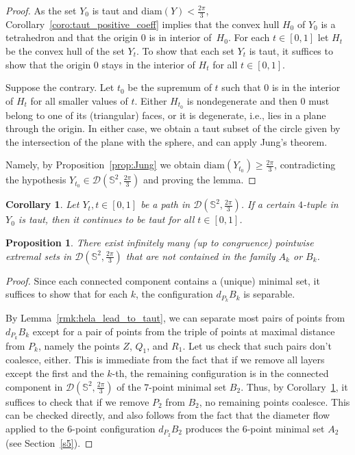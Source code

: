 \documentclass[12pt]{amsart}
\theoremstyle{plain}
\newtheorem{corollary}[theorem]{Corollary}
\newtheorem{proposition}[theorem]{Proposition}
\newcommand{\Sp}{\mathbb{S}}
\newcommand{\diam}{\mathrm{diam}}
\newcommand{\np}{Z}
\numberwithin{equation}{section}
\begin{document}
\begin{proof}
As the set $Y_0$ is taut and $\diam(Y)<\frac{2\pi}{3}$,
Corollary~\ref{coro:taut_positive_coeff} implies that the convex hull
$H_0$ of $Y_0$ is a tetrahedron and that the origin $0$ is in interior
of~$H_0$.  For each $t\in[0,1]$ let $H_t$ be the convex hull of the
set $Y_t$.  To show that each set $Y_t$ is taut, it suffices to show
that the origin $0$ stays in the interior of $H_t$ for all
$t\in[0,1]$.
	
Suppose the contrary.  Let $t_0$ be the supremum of $t$ such that $0$
is in the interior of $H_t$ for all smaller values of $t$.  Either
$H_{t_0}$ is nondegenerate and then $0$ must belong to one of its
(triangular) faces, or it is degenerate, i.e., lies in a plane through
the origin.  In either case, we obtain a taut subset of the circle
given by the intersection of the plane with the sphere, and can apply
Jung's theorem.
	

	
	
	
	Namely, by Proposition~\ref{prop:Jung} we obtain $\diam(Y_{t_0}) \geq
	\frac{2\pi}{3}$, contradicting the hypothesis $Y_{t_0}\in \mathcal
	D(\Sp^2, \frac{2\pi}{3})$ and proving the lemma.
	\end{proof}

\begin{corollary}
\label{coro:continuous_family_seperable}
Let $Y_t, t\in[0,1]$ be a path in $\mathcal D(\Sp^2,\frac{2\pi}3)$.
If a certain $4$-tuple in $Y_0$ is taut, then it continues to be taut
for all $t\in [0,1]$.
\end{corollary}

\begin{proposition}
\label{p17}
There exist infinitely many (up to congruence) pointwise extremal sets
in $\mathcal D(\Sp^2, \frac{2\pi}{3})$ that are not contained in the
family $A_k$ or $B_k$.
\end{proposition}

\begin{proof}
Since each connected component contains a (unique) minimal set, it
suffices to show that for each $k$, the configuration $d_{P_k}B_{k}$
is separable.

By Lemma~\ref{rmk:hela_lead_to_taut}, we can separate most pairs of
points from $d_{P_k}B_k$ except for a pair of points from the triple
of points at maximal distance from $P_k$, namely the points $\np$,
$Q_1$, and $R_1$.  Let us check that such pairs don't coalesce,
either.  This is immediate from the fact that if we remove all layers
except the first and the $k$-th, the remaining configuration is in the
connected component in $\mathcal D(\Sp^2,\frac{2\pi}3)$ of the
$7$-point minimal set $B_2$.  Thus, by
Corollary~\ref{coro:continuous_family_seperable}, it suffices to check
that if we remove $P_2$ from $B_2$, no remaining points coalesce.
This can be checked directly, and also follows from the fact that the
diameter flow applied to the 6-point configuration $d_{P_2}B_2$
produces the 6-point minimal set $A_2$ (see Section~\ref{s5}).
\end{proof}
\end{document}
